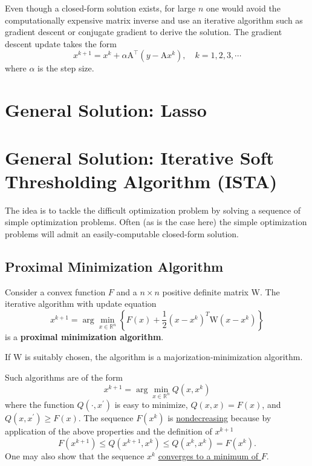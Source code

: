 \documentclass[11pt]{elegantbook}
\begin{document}
Even though a closed-form solution exists, for large $n$ one would avoid the computationally expensive matrix inverse and use an iterative algorithm such as gradient descent or conjugate gradient to derive the solution. The gradient descent update takes the form
$$
x^{k+1}=x^k+\alpha \mathrm{A}^{\top}\left(y-\mathrm{A} x^k\right), \quad k=1,2,3, \cdots
$$
where $\alpha$ is the step size.

\section{General Solution: Lasso}

\section{General Solution: Iterative Soft Thresholding Algorithm (ISTA)}
The idea is to tackle the difficult optimization problem by solving a sequence of simple optimization problems. Often (as is the case here) the simple optimization problems will admit an easily-computable closed-form solution.

\subsection{Proximal Minimization Algorithm}
\begin{definition}
    Consider a convex function $F$ and a $n \times n$ positive definite matrix W. The iterative algorithm with update equation
    $$
    x^{k+1}=\arg \min _{x \in \mathbb{R}^n}\left\{F(x)+\frac{1}{2}\left(x-x^k\right)^T \mathrm{W}\left(x-x^k\right)\right\}
    $$
    is a \textbf{proximal minimization algorithm}.
\end{definition}

If $\mathrm{W}$ is suitably chosen, the algorithm is a majorization-minimization algorithm.
\begin{lemma}
    Such algorithms are of the form
    $$
    x^{k+1}=\arg \min _{x \in \mathbb{R}^n} Q\left(x, x^k\right)
    $$
    where the function $Q\left(\cdot, x^{\prime}\right)$ is easy to minimize, $Q(x, x)=F(x)$, and $Q\left(x, x^{\prime}\right) \geq F(x)$. The sequence $F\left(x^k\right)$ is \underline{nondecreasing} because by application of the above properties and the definition of $x^{k+1}$
    $$
    F\left(x^{k+1}\right) \leq Q\left(x^{k+1}, x^k\right) \leq Q\left(x^k, x^k\right)=F\left(x^k\right) .
    $$
    One may also show that the sequence $x^k$ \underline{converges to a minimum of $F$}.
\end{lemma}
\end{document}
